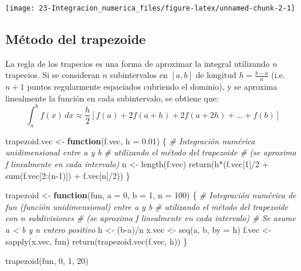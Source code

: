 \documentclass[
]{book}
\newenvironment{Shaded}{\begin{snugshade}}{\end{snugshade}}
\newcommand{\AttributeTok}[1]{\textcolor[rgb]{0.77,0.63,0.00}{#1}}
\newcommand{\CommentTok}[1]{\textcolor[rgb]{0.56,0.35,0.01}{\textit{#1}}}
\newcommand{\ControlFlowTok}[1]{\textcolor[rgb]{0.13,0.29,0.53}{\textbf{#1}}}
\newcommand{\DecValTok}[1]{\textcolor[rgb]{0.00,0.00,0.81}{#1}}
\newcommand{\FloatTok}[1]{\textcolor[rgb]{0.00,0.00,0.81}{#1}}
\newcommand{\FunctionTok}[1]{\textcolor[rgb]{0.00,0.00,0.00}{#1}}
\newcommand{\NormalTok}[1]{#1}
\newcommand{\OtherTok}[1]{\textcolor[rgb]{0.56,0.35,0.01}{#1}}
\newcommand{\SpecialCharTok}[1]{\textcolor[rgb]{0.00,0.00,0.00}{#1}}
\theoremstyle{break}
\theoremstyle{nonumberplain}
\begin{document}
\begin{center}\texttt{[image: 23-Integracion\_numerica\_files/figure-latex/unnamed-chunk-2-1]} \end{center}

\hypertarget{muxe9todo-del-trapezoide}{%
\subsection{Método del trapezoide}\label{muxe9todo-del-trapezoide}}

La regla de los trapecios es una forma de aproximar la integral utilizando \(n\) trapecios.
Si se consideran \(n\) subintervalos en \([a,b]\) de longitud \(h= \frac{b-a}{n}\)
(i.e.~\(n + 1\) puntos regularmente espaciados cubriendo el dominio), y
se aproxima linealmente la función en cada subintervalo, se obtiene que:
\[\int_a^b f(x)\, dx \approx \frac{h}{2} [f(a)+2f(a+h)+2f(a+2h)+...+f(b)]\]

\begin{Shaded}
\begin{Highlighting}[]
\NormalTok{trapezoid.vec }\OtherTok{\textless{}{-}} \ControlFlowTok{function}\NormalTok{(f.vec, }\AttributeTok{h =} \FloatTok{0.01}\NormalTok{) \{}
\CommentTok{\# Integración numérica unidimensional entre a y b}
\CommentTok{\# utilizando el método del trapezoide }
\CommentTok{\# (se aproxima f linealmente en cada intervalo)}
\NormalTok{  n }\OtherTok{\textless{}{-}} \FunctionTok{length}\NormalTok{(f.vec) }
  \FunctionTok{return}\NormalTok{(h}\SpecialCharTok{*}\NormalTok{(f.vec[}\DecValTok{1}\NormalTok{]}\SpecialCharTok{/}\DecValTok{2} \SpecialCharTok{+} \FunctionTok{sum}\NormalTok{(f.vec[}\DecValTok{2}\SpecialCharTok{:}\NormalTok{(n}\DecValTok{{-}1}\NormalTok{)]) }\SpecialCharTok{+}\NormalTok{ f.vec[n]}\SpecialCharTok{/}\DecValTok{2}\NormalTok{))}
\NormalTok{\}}

\NormalTok{trapezoid }\OtherTok{\textless{}{-}} \ControlFlowTok{function}\NormalTok{(fun, }\AttributeTok{a =} \DecValTok{0}\NormalTok{, }\AttributeTok{b =} \DecValTok{1}\NormalTok{, }\AttributeTok{n =} \DecValTok{100}\NormalTok{) \{}
\CommentTok{\# Integración numérica de fun (función unidimensional) entre a y b}
\CommentTok{\# utilizando el método del trapezoide con n subdivisiones}
\CommentTok{\# (se aproxima f linealmente en cada intervalo)}
\CommentTok{\# Se asume a \textless{} b y n entero positivo }
\NormalTok{  h }\OtherTok{\textless{}{-}}\NormalTok{ (b}\SpecialCharTok{{-}}\NormalTok{a)}\SpecialCharTok{/}\NormalTok{n}
\NormalTok{  x.vec }\OtherTok{\textless{}{-}} \FunctionTok{seq}\NormalTok{(a, b, }\AttributeTok{by =}\NormalTok{ h)}
\NormalTok{  f.vec }\OtherTok{\textless{}{-}} \FunctionTok{sapply}\NormalTok{(x.vec, fun)}
  \FunctionTok{return}\NormalTok{(}\FunctionTok{trapezoid.vec}\NormalTok{(f.vec, h))}
\NormalTok{\}}

\FunctionTok{trapezoid}\NormalTok{(fun, }\DecValTok{0}\NormalTok{, }\DecValTok{1}\NormalTok{, }\DecValTok{20}\NormalTok{)}
\end{Highlighting}
\end{Shaded}
\end{document}
